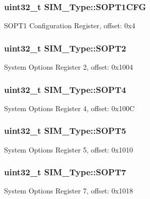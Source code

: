 \subsubsection[{\texorpdfstring{S\+O\+P\+T1\+C\+FG}{SOPT1CFG}}]{ uint32\+\_\+t S\+I\+M\+\_\+\+Type\+::\+S\+O\+P\+T1\+C\+FG}\hypertarget{structSIM__Type_a5dcd927f581c0770092bd59289fe7145}{}\label{structSIM__Type_a5dcd927f581c0770092bd59289fe7145}
S\+O\+P\+T1 Configuration Register, offset\+: 0x4 
\subsubsection[{\texorpdfstring{S\+O\+P\+T2}{SOPT2}}]{ uint32\+\_\+t S\+I\+M\+\_\+\+Type\+::\+S\+O\+P\+T2}\hypertarget{structSIM__Type_a42567e1697afc977709f14fe6d9f96a8}{}\label{structSIM__Type_a42567e1697afc977709f14fe6d9f96a8}
System Options Register 2, offset\+: 0x1004 
\subsubsection[{\texorpdfstring{S\+O\+P\+T4}{SOPT4}}]{ uint32\+\_\+t S\+I\+M\+\_\+\+Type\+::\+S\+O\+P\+T4}\hypertarget{structSIM__Type_a44b7f87f2a822cb3f8f1275f478e485d}{}\label{structSIM__Type_a44b7f87f2a822cb3f8f1275f478e485d}
System Options Register 4, offset\+: 0x100C 
\subsubsection[{\texorpdfstring{S\+O\+P\+T5}{SOPT5}}]{ uint32\+\_\+t S\+I\+M\+\_\+\+Type\+::\+S\+O\+P\+T5}\hypertarget{structSIM__Type_a29d8c8ea1f1cd3f4f1b34b4a48066b63}{}\label{structSIM__Type_a29d8c8ea1f1cd3f4f1b34b4a48066b63}
System Options Register 5, offset\+: 0x1010 
\subsubsection[{\texorpdfstring{S\+O\+P\+T7}{SOPT7}}]{ uint32\+\_\+t S\+I\+M\+\_\+\+Type\+::\+S\+O\+P\+T7}\hypertarget{structSIM__Type_acf5d10bb5b9bcea4c60a1b30b7499f2e}{}\label{structSIM__Type_acf5d10bb5b9bcea4c60a1b30b7499f2e}
System Options Register 7, offset\+: 0x1018 
